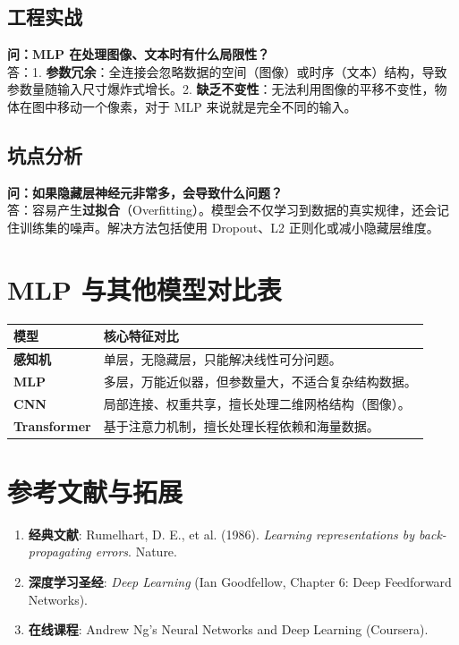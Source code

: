 \documentclass[12pt, a4paper]{article}
\begin{document}
\subsection{工程实战}
\textbf{问：MLP 在处理图像、文本时有什么局限性？}\\
答：1. \textbf{参数冗余}：全连接会忽略数据的空间（图像）或时序（文本）结构，导致参数量随输入尺寸爆炸式增长。2. \textbf{缺乏不变性}：无法利用图像的平移不变性，物体在图中移动一个像素，对于 MLP 来说就是完全不同的输入。

\subsection{坑点分析}
\textbf{问：如果隐藏层神经元非常多，会导致什么问题？}\\
答：容易产生\textbf{过拟合}（Overfitting）。模型会不仅学习到数据的真实规律，还会记住训练集的噪声。解决方法包括使用 Dropout、L2 正则化或减小隐藏层维度。

\section{MLP 与其他模型对比表}

\begin{table}[h]
\centering
\begin{tabularx}{\textwidth}{|l|X|}
\hline
\textbf{模型} & \textbf{核心特征对比} \\
\hline
\textbf{感知机} & 单层，无隐藏层，只能解决线性可分问题。 \\
\hline
\textbf{MLP} & 多层，万能近似器，但参数量大，不适合复杂结构数据。 \\
\hline
\textbf{CNN} & 局部连接、权重共享，擅长处理二维网格结构（图像）。 \\
\hline
\textbf{Transformer} & 基于注意力机制，擅长处理长程依赖和海量数据。 \\
\hline
\end{tabularx}
\end{table}

\section{参考文献与拓展}
\begin{enumerate}
    \item \textbf{经典文献}: Rumelhart, D. E., et al. (1986). \textit{Learning representations by back-propagating errors}. Nature.
    \item \textbf{深度学习圣经}: \textit{Deep Learning} (Ian Goodfellow, Chapter 6: Deep Feedforward Networks).
    \item \textbf{在线课程}: Andrew Ng's Neural Networks and Deep Learning (Coursera).
\end{enumerate}
\end{document}
